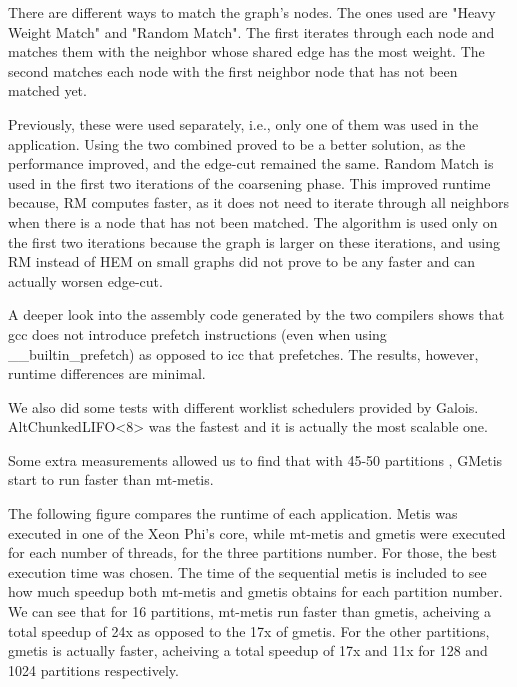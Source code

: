 \documentclass[abstract=on,9pt,twocolumn]{scrartcl}
\begin{document}
There are different ways to match the graph's nodes. The ones used are
"Heavy Weight Match" and "Random Match". The first iterates through each
node and matches them with the neighbor whose shared edge has the most
weight. The second matches each node with the first neighbor node that
has not been matched yet.

Previously, these were used separately, i.e., only one of them was
used in the application. Using the two combined proved to be a better
solution, as the performance improved, and the edge-cut remained the
same. Random Match is used in the first two iterations of the coarsening
phase. This improved runtime because, RM computes faster, as it does not
need to iterate through all neighbors when there is a node that has not
been matched. The algorithm is used only on the first two iterations
because the graph is larger on these iterations, and using RM instead of
HEM on small graphs did not prove to be any faster and can actually worsen
edge-cut.

A deeper look into the assembly code generated by the two compilers
shows that gcc does not introduce prefetch instructions (even when using
\_\_builtin\_prefetch) as opposed to icc that prefetches. The results,
however, runtime differences are minimal.

We also did some tests with different worklist schedulers provided by
Galois. AltChunkedLIFO<8> was the fastest and it is actually the most
scalable one.

Some extra measurements allowed us to find that with 45-50 partitions
, GMetis start to run faster than mt-metis.



The following figure compares the runtime of each application. Metis was
executed in one of the Xeon Phi's core, while mt-metis and gmetis were executed
for each number of threads, for the three partitions number. For those, the best execution time was
chosen. The time of the sequential metis is included to see how much
speedup both mt-metis and gmetis obtains for each partition number. 
We can see that for 16 partitions, mt-metis run faster than gmetis,
acheiving a total speedup of 24x as opposed to the 17x of gmetis.
For the other partitions, gmetis is actually faster, acheiving a total
speedup of 17x and 11x for 128 and 1024 partitions respectively.
\end{document}
